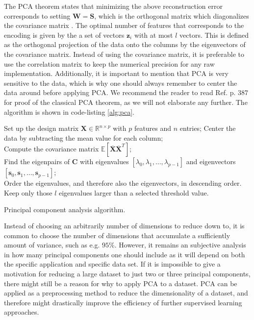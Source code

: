The PCA theorem states that minimizing the above reconstruction error corresponds to setting $\boldsymbol{W}=\boldsymbol{S}$, which is the orthogonal matrix which diagonalizes the covariance matrix \cite{Murphy2012}. The optimal number of features that corresponds to the encoding is given by the a set of vectors $\boldsymbol{z}_i$ with at most $l$ vectors. This is defined as the orthogonal projection of the data onto the columns by the eigenvectors of the covariance matrix. Instead of using the covariance matrix, it is preferable to use the correlation matrix to keep the numerical precision for any raw implementation. Additionally, it is important to mention that PCA is very sensitive to the data, which is why one should always remember to center the data around before applying PCA.  We recommend the reader to read Ref. \cite{Murphy2012} p. $387$ for proof of the classical PCA theorem, as we will not elaborate any further. The algorithm is shown in code-listing \ref{alg:pca}.

\begin{algorithm}[H]
\SetAlgoLined
 Set up the design matrix $\boldsymbol{X}\in {\mathbb{R}}^{n\times p}$ with $p$ features and $n$ entries;
 Center the data by subtracting the mean value for each column;\\
 Compute the covariance matrix $\mathbb{E}[\overline{\boldsymbol{X}}\overline{\boldsymbol{X}}^T]$; \\
 Find the eigenpairs of $\boldsymbol{C}$ with eigenvalues $[\lambda_0,\lambda_1,\dots,\lambda_{p-1}]$ and eigenvectors $[\boldsymbol{s}_0,\boldsymbol{s}_1,\dots,\boldsymbol{s}_{p-1}]$;\\
 Order the eigenvalues, and therefore also the eigenvectors, in descending order.
 Keep only those $l$ eigenvalues larger than a selected threshold value.
 \caption{Principal component analysis algorithm.}
 \label{alg:pca}
\end{algorithm}

Instead of choosing an arbitrarily number of dimensions to reduce down to, it is common to choose the number of dimensions that accumulate a sufficiently amount of variance, such as e.g. $95 \%$. However, it remains an subjective analysis in how many principal components one should include as it will depend on both the specific application and specific data set. If it is impossible to give a motivation for reducing a large dataset to just two or three principal components, there might still be a reason for why to apply PCA to a dataset. PCA can be applied as a preprocessing method to reduce the dimensionality of a dataset, and therefore might drastically improve the efficiency of further supervised learning approaches.

